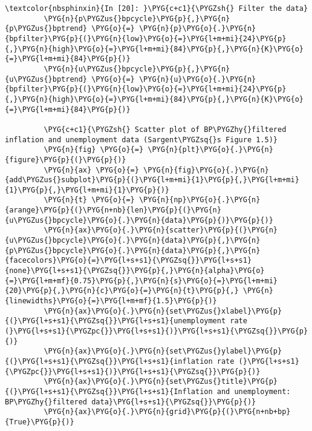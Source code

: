 \documentclass[letterpaper,10pt,openany,oneside,english]{sphinxmanual}
\begin{document}
\begin{Verbatim}[commandchars=\\\{\}]
\textcolor{nbsphinxin}{In [20]: }\PYG{c+c1}{\PYGZsh{} Filter the data}
         \PYG{n}{p\PYGZus{}bpcycle}\PYG{p}{,}\PYG{n}{p\PYGZus{}bptrend} \PYG{o}{=} \PYG{n}{p}\PYG{o}{.}\PYG{n}{bpfilter}\PYG{p}{(}\PYG{n}{low}\PYG{o}{=}\PYG{l+m+mi}{24}\PYG{p}{,}\PYG{n}{high}\PYG{o}{=}\PYG{l+m+mi}{84}\PYG{p}{,}\PYG{n}{K}\PYG{o}{=}\PYG{l+m+mi}{84}\PYG{p}{)}
         \PYG{n}{u\PYGZus{}bpcycle}\PYG{p}{,}\PYG{n}{u\PYGZus{}bptrend} \PYG{o}{=} \PYG{n}{u}\PYG{o}{.}\PYG{n}{bpfilter}\PYG{p}{(}\PYG{n}{low}\PYG{o}{=}\PYG{l+m+mi}{24}\PYG{p}{,}\PYG{n}{high}\PYG{o}{=}\PYG{l+m+mi}{84}\PYG{p}{,}\PYG{n}{K}\PYG{o}{=}\PYG{l+m+mi}{84}\PYG{p}{)}
         
         \PYG{c+c1}{\PYGZsh{} Scatter plot of BP\PYGZhy{}filtered inflation and unemployment data (Sargent\PYGZsq{}s Figure 1.5)}
         \PYG{n}{fig} \PYG{o}{=} \PYG{n}{plt}\PYG{o}{.}\PYG{n}{figure}\PYG{p}{(}\PYG{p}{)}
         \PYG{n}{ax} \PYG{o}{=} \PYG{n}{fig}\PYG{o}{.}\PYG{n}{add\PYGZus{}subplot}\PYG{p}{(}\PYG{l+m+mi}{1}\PYG{p}{,}\PYG{l+m+mi}{1}\PYG{p}{,}\PYG{l+m+mi}{1}\PYG{p}{)}
         \PYG{n}{t} \PYG{o}{=} \PYG{n}{np}\PYG{o}{.}\PYG{n}{arange}\PYG{p}{(}\PYG{n+nb}{len}\PYG{p}{(}\PYG{n}{u\PYGZus{}bpcycle}\PYG{o}{.}\PYG{n}{data}\PYG{p}{)}\PYG{p}{)}
         \PYG{n}{ax}\PYG{o}{.}\PYG{n}{scatter}\PYG{p}{(}\PYG{n}{u\PYGZus{}bpcycle}\PYG{o}{.}\PYG{n}{data}\PYG{p}{,}\PYG{n}{p\PYGZus{}bpcycle}\PYG{o}{.}\PYG{n}{data}\PYG{p}{,}\PYG{n}{facecolors}\PYG{o}{=}\PYG{l+s+s1}{\PYGZsq{}}\PYG{l+s+s1}{none}\PYG{l+s+s1}{\PYGZsq{}}\PYG{p}{,}\PYG{n}{alpha}\PYG{o}{=}\PYG{l+m+mf}{0.75}\PYG{p}{,}\PYG{n}{s}\PYG{o}{=}\PYG{l+m+mi}{20}\PYG{p}{,}\PYG{n}{c}\PYG{o}{=}\PYG{n}{t}\PYG{p}{,} \PYG{n}{linewidths}\PYG{o}{=}\PYG{l+m+mf}{1.5}\PYG{p}{)}
         \PYG{n}{ax}\PYG{o}{.}\PYG{n}{set\PYGZus{}xlabel}\PYG{p}{(}\PYG{l+s+s1}{\PYGZsq{}}\PYG{l+s+s1}{unemployment rate (}\PYG{l+s+s1}{\PYGZpc{}}\PYG{l+s+s1}{)}\PYG{l+s+s1}{\PYGZsq{}}\PYG{p}{)}
         \PYG{n}{ax}\PYG{o}{.}\PYG{n}{set\PYGZus{}ylabel}\PYG{p}{(}\PYG{l+s+s1}{\PYGZsq{}}\PYG{l+s+s1}{inflation rate (}\PYG{l+s+s1}{\PYGZpc{}}\PYG{l+s+s1}{)}\PYG{l+s+s1}{\PYGZsq{}}\PYG{p}{)}
         \PYG{n}{ax}\PYG{o}{.}\PYG{n}{set\PYGZus{}title}\PYG{p}{(}\PYG{l+s+s1}{\PYGZsq{}}\PYG{l+s+s1}{Inflation and unemployment: BP\PYGZhy{}filtered data}\PYG{l+s+s1}{\PYGZsq{}}\PYG{p}{)}
         \PYG{n}{ax}\PYG{o}{.}\PYG{n}{grid}\PYG{p}{(}\PYG{n+nb+bp}{True}\PYG{p}{)}
\end{Verbatim}

\noindent{}
\end{document}
